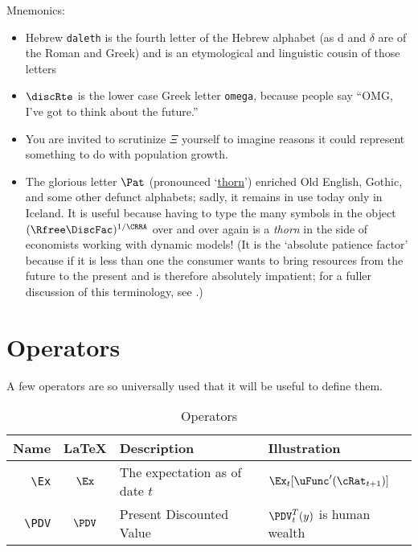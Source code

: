 \documentclass[12pt]{\econtex}
\begin{document}
Mnemonics:
\begin{itemize}
\item Hebrew \texttt{daleth} is the fourth letter of the Hebrew alphabet (as d and $\delta$ are of the Roman and Greek) and is an etymological and linguistic cousin of those letters
\item $\discRte$ is the lower case Greek letter \texttt{omega}, because people say ``OMG, I've got to think about the future.''
\item You are invited to scrutinize $\Xi$ yourself to imagine reasons it could represent something to do with population growth.  
\item The glorious letter $\Pat$ (pronounced `\href{http://en.wikipedia.org/wiki/Thorn_(letter)}{thorn}') enriched Old English, Gothic, and some other defunct alphabets; sadly, it remains in use today only in Iceland.  It is useful because having to type the many symbols in the object $(\Rfree \DiscFac)^{1/\CRRA}$ over and over again is a \textit{thorn} in the side of economists working with dynamic models!  (It is the `absolute patience factor' because if it is less than one the consumer wants to bring resources from the future to the present and is therefore absolutely impatient; for a fuller discussion of this terminology, see \cite{carrollTractable}.)
\end{itemize}


\hypertarget{Operators}{}
\section{Operators}
A few operators are so universally used that it will be useful to define them.

\begin{table}[ht]
  \centering
  \begin{tabular}{|>{\ttfamily}rcll|} 		
    \hline
    Name    & \LaTeX         & Description & Illustration
    \\ \hline
    \verb|\Ex|        & $\Ex$       & The expectation as of date $t$ & $\Ex_{t}[\uFunc^{\prime}(\cRat_{t+1})]$
    \\   \verb|\PDV|        & $\PDV$       & Present Discounted Value & $\PDV_{t}^{T}(y)$ is human wealth
    \\	\hline
  \end{tabular}
  \caption{Operators}
  \label{table:Operators}
\end{table}	



\hypertarget{Modifiers}{}
\end{document}
